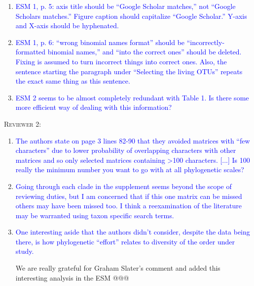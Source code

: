 \documentclass[12pt,letterpaper]{article}
\renewcommand{\section}[1]{%
\bigskip
\begin{center}
\begin{Large}
\normalfont\scshape #1
\medskip
\end{Large}
\end{center}}
\begin{document}
\begin{enumerate}
\item{\textcolor{blue}{ESM 1, p. 5: axis title should be ``Google Scholar matches,'' not ``Google Scholars matches.'' Figure caption should capitalize ``Google Scholar.'' Y-axis and X-axis should be hyphenated.}}
\item{\textcolor{blue}{ESM 1, p. 6: ``wrong binomial names format'' should be ``incorrectly-formatted binomial names,'' and ``into the correct ones'' should be deleted. Fixing is assumed to turn incorrect things into correct ones. Also, the sentence starting the paragraph under ``Selecting the living OTUs'' repeats the exact same thing as this sentence.}}
\item{\textcolor{blue}{ESM 2 seems to be almost completely redundant with Table 1. Is there some more efficient way of dealing with this information?}}
\end{enumerate}


\section{Reviewer 2:}
\begin{enumerate}
\item{\textcolor{blue}{The authors state on page 3 lines 82-90 that they avoided matrices with ``few characters'' due to lower probability of overlapping characters with other matrices and so only selected matrices containing >100 characters. [...] Is 100 really the minimum number you want to go with at all phylogenetic scales?}}
\item{\textcolor{blue}{Going through each clade in the supplement seems beyond the scope of reviewing duties, but I am concerned that if this one matrix can be missed others may have been missed too. I think a reexamination of the literature may be warranted using taxon specific search terms.}}
\item{\textcolor{blue}{One interesting aside that the authors didn’t consider, despite the data being there, is how phylogenetic ``effort'' relates to diversity of the order under study.}}

We are really grateful for Graham Slater's %
comment and added this interesting analysis in the ESM @@@%
\end{enumerate}
\end{document}
